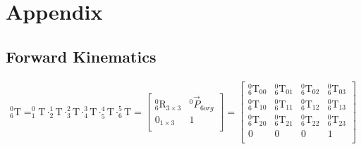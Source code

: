 \chapter{Appendix}
\newpage
\section{Forward Kinematics}\label{appendix:forward}
\begin{equation*}
\begin{split}
^0_6\text{T} =
^0_1\text{T} \cdot ^1_2\text{T} \cdot ^2_3\text{T} \cdot ^3_4\text{T} \cdot ^4_5\text{T} \cdot ^5_6\text{T} =
\begin{bmatrix}
^0_6\text{R}_{3\times 3} 	&^0\vec{P}_{6org}\\
0_{1\times 3}				&1\\
\end{bmatrix}
=
\begin{bmatrix}
^0_6\text{T}_{00} 	&^0_6\text{T}_{01}	&^0_6\text{T}_{02}	& ^0_6\text{T}_{03}\\
^0_6\text{T}_{10} 	&^0_6\text{T}_{11}	&^0_6\text{T}_{12}	& ^0_6\text{T}_{13}\\
^0_6\text{T}_{20} 	&^0_6\text{T}_{21}	&^0_6\text{T}_{22}	& ^0_6\text{T}_{23}\\
0					&0					&0					&1\\
\end{bmatrix}
\end{split}
\end{equation*}
